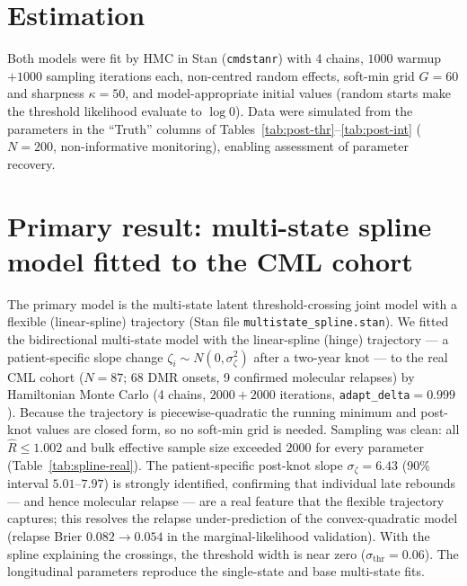\documentclass[11pt]{article}
\begin{document}
\section{Estimation}
Both models were fit by HMC in Stan (\texttt{cmdstanr}) with 4 chains,
$1000$ warmup $+1000$ sampling iterations each, non-centred random effects,
soft-min grid $G=60$ and sharpness $\kappa=50$, and model-appropriate initial
values (random starts make the threshold likelihood evaluate to $\log 0$).
Data were simulated from the parameters in the ``Truth'' columns of
Tables~\ref{tab:post-thr}--\ref{tab:post-int} ($N=200$, non-informative
monitoring), enabling assessment of parameter recovery.

\section{Primary result: multi-state spline model fitted to the CML cohort}
\label{sec:spline-real}

The primary model is the multi-state latent threshold-crossing joint model with
a flexible (linear-spline) trajectory (Stan file \texttt{multistate\_spline.stan}).
We fitted the bidirectional multi-state model with the linear-spline (hinge)
trajectory --- a patient-specific slope change $\zeta_i\sim N(0,\sigma_\zeta^2)$
after a two-year knot --- to the real CML cohort ($N=87$; 68 DMR onsets, 9
confirmed molecular relapses) by Hamiltonian Monte Carlo (4 chains,
$2000+2000$ iterations, \texttt{adapt\_delta}$=0.999$). Because the trajectory
is piecewise-quadratic the running minimum and post-knot values are closed form,
so no soft-min grid is needed. Sampling was clean: all $\widehat R\le1.002$ and
bulk effective sample size exceeded $2000$ for every parameter
(Table~\ref{tab:spline-real}). The patient-specific post-knot slope
$\sigma_\zeta=6.43$ (90\% interval $5.01$--$7.97$) is strongly identified,
confirming that individual late rebounds --- and hence molecular relapse --- are
a real feature that the flexible trajectory captures; this resolves the relapse
under-prediction of the convex-quadratic model (relapse Brier $0.082\to0.054$ in
the marginal-likelihood validation). With the spline explaining the crossings,
the threshold width is near zero ($\sigma_{\mathrm{thr}}=0.06$). The longitudinal
parameters reproduce the single-state and base multi-state fits.
\end{document}
